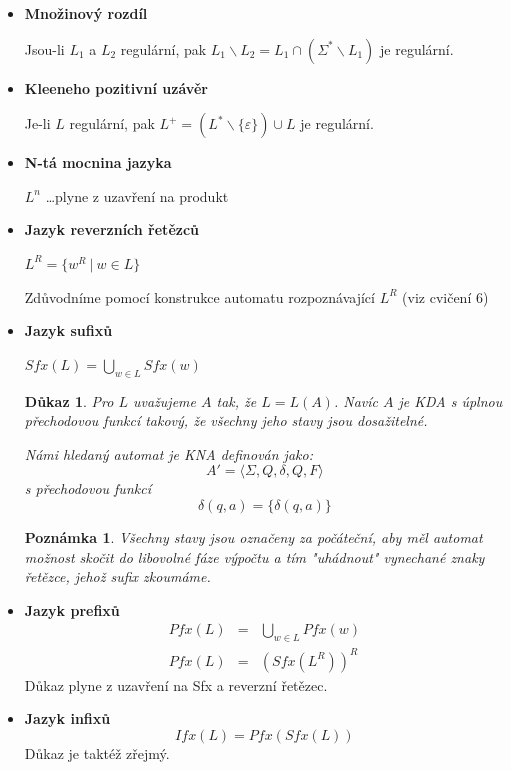 \documentclass[10pt, a4paper, titlepage]{article}
\theoremstyle{note}
\newtheorem{dukaz}{\textbf{Důkaz}}
\newtheorem{poznamka}{\textbf{Poznámka}}
\begin{document}
\begin{itemize}

\item
\textbf{Množinový rozdíl}

Jsou-li $L_1$ a $L_2$ regulární, pak $L_1 \backslash L_2 = L_1 \cap (\Sigma^* \backslash L_1)$ je regulární.

\item
\textbf{Kleeneho pozitivní uzávěr}

Je-li $L$ regulární, pak $L^+ = (L^* \backslash \lbrace \varepsilon \rbrace) \cup L$ je regulární.

\item
\textbf{N-tá mocnina jazyka}

$L^n$ \ldots plyne z uzavření na produkt

\item
\textbf{Jazyk reverzních řetězců}

$L^R = \lbrace w^R \ |\ w \in L \rbrace$

Zdůvodníme pomocí konstrukce automatu rozpoznávající $L^R$ (viz cvičení 6) 

\item
\textbf{Jazyk sufixů}

$Sfx(L) = \bigcup_{w \in L} Sfx(w)$

\begin{dukaz}
Pro $L$ uvažujeme $A$ tak, že $L = L(A)$. Navíc $A$ je KDA s úplnou přechodovou funkcí takový, že všechny jeho stavy jsou dosažitelné.

Námi hledaný automat je KNA definován jako:
$$A' = \langle \Sigma,Q,\delta,Q,F \rangle$$
s přechodovou funkcí
$$\delta(q,a) = \lbrace \delta(q,a) \rbrace$$
\end{dukaz}
\begin{poznamka}
Všechny stavy jsou označeny za počáteční, aby měl automat možnost skočit do libovolné fáze výpočtu a tím "uhádnout" vynechané znaky řetězce, jehož sufix zkoumáme.
\end{poznamka}

\item
\textbf{Jazyk prefixů}
\begin{eqnarray*}
Pfx(L) &=& \bigcup_{w \in L} Pfx(w) \\
Pfx(L) &=& (Sfx(L^R))^R
\end{eqnarray*}
Důkaz plyne z uzavření na Sfx a reverzní řetězec.

\item
\textbf{Jazyk infixů}
$$
Ifx(L) = Pfx(Sfx(L))
$$
Důkaz je taktéž zřejmý.
\end{itemize}
\end{document}
